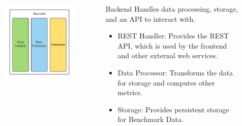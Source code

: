 \begin{frame}
    \begin{columns}[T]
        \begin{column}{.48\textwidth}
            \begin{figure}[H]
                \includegraphics[width=\textwidth]{images/systemmodel_backend.pdf}
                \label{fig:backendmodel}
            \end{figure}
        \end{column}
        \hfill
        \begin{column}{.48\textwidth}
            \begin{block}{Backend}
                Handles data processing, storage, and an API to interact with.
            \end{block}
            \begin{itemize}
                \item<2-> REST Handler:\newline{} Provides the REST API, which is used by the frontend and other external web services.
                \item<3-> Data Processor:\newline{} Transforms the data for storage and computes other metrics.
                \item<4-> Storage:\newline{} Provides persistent storage for Benchmark Data.
            \end{itemize}
        \end{column}
    \end{columns}
\end{frame}


